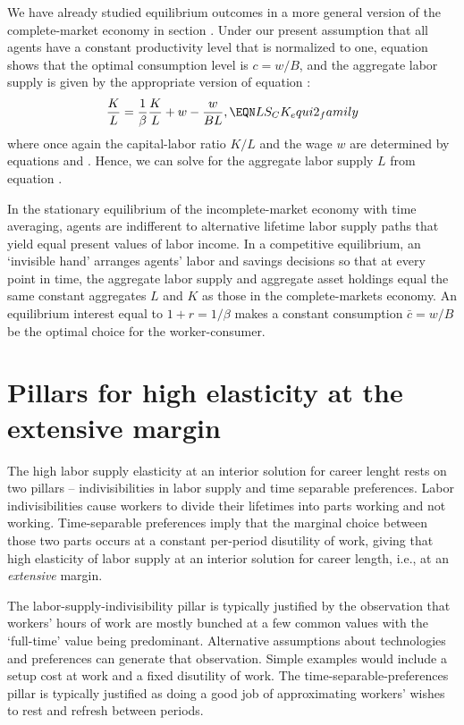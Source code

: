 We have already studied equilibrium outcomes in a more
general version of the complete-market economy in section
. Under our present assumption
that all agents have a constant productivity level
that is normalized to one, equation 
shows that the optimal consumption level is $c=w/B$, and
the aggregate labor supply is given by the appropriate
version of equation :
$$
{K \over L} = {1 \over \beta } {K \over L} + w
     - { w \over B L},
                                                    \EQN LS_CK_equi2_family
$$
where once again the capital-labor ratio $K/L$ and the wage
$w$ are determined by equations  and
. Hence, we can solve for the aggregate labor
supply $L$ from equation .

In the stationary equilibrium of the incomplete-market economy
with time averaging,  agents are indifferent to
alternative lifetime labor supply paths that yield equal  present values of labor income. In a competitive
equilibrium, an `invisible hand'
 arranges  agents' labor and
savings decisions so that at every point in time, the aggregate
labor supply and aggregate asset holdings equal the same
constant aggregates $L$ and $K$ as those in  the complete-markets economy.
An equilibrium interest equal
to $1+r=1/\beta$ makes a constant
consumption $\bar c=w/B$ be the optimal choice for the worker-consumer.


\section{Pillars for high elasticity at the extensive margin}

The high labor supply elasticity at an interior
solution for career lenght rests on two pillars -- indivisibilities
in labor supply and time separable preferences. Labor 
indivisibilities cause workers 
to divide their lifetimes into parts  working and not working.  
Time-separable preferences imply that the marginal choice 
between those two parts occurs at a constant per-period disutility of 
work, giving that  high elasticity of labor supply at an interior 
solution for career length, i.e., at an {\it extensive} margin.

The labor-supply-indivisibility pillar is typically justified
by  the observation  that workers' hours of work
are mostly bunched at a few common values   with the `full-time'  value being  predominant.
Alternative assumptions about technologies and preferences can generate that 
observation. Simple examples would include a setup cost at work and
a fixed disutility of work. The time-separable-preferences pillar
is typically justified as doing a good job of approximating workers' wishes to rest and  refresh 
between periods.


